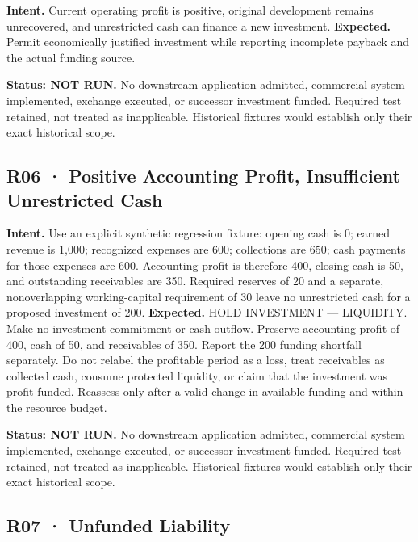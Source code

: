 \documentclass[10pt,letterpaper]{article}
\begin{document}
\textbf{Intent.} Current operating profit is positive, original
development remains unrecovered, and unrestricted cash can finance a new
investment. \textbf{Expected.} Permit economically justified investment
while reporting incomplete payback and the actual funding source.

\textbf{Status: NOT RUN.} No downstream application admitted, commercial
system implemented, exchange executed, or successor investment funded.
Required test retained, not treated as inapplicable. Historical fixtures
would establish only their exact historical scope.

\hypertarget{r06-positive-accounting-profit-insufficient-unrestricted-cash}{%
\subsection{R06 · Positive Accounting Profit, Insufficient Unrestricted
Cash}\label{r06-positive-accounting-profit-insufficient-unrestricted-cash}}

\textbf{Intent.} Use an explicit synthetic regression fixture: opening
cash is 0; earned revenue is 1,000; recognized expenses are 600;
collections are 650; cash payments for those expenses are 600.
Accounting profit is therefore 400, closing cash is 50, and outstanding
receivables are 350. Required reserves of 20 and a separate,
nonoverlapping working-capital requirement of 30 leave no unrestricted
cash for a proposed investment of 200. \textbf{Expected.} HOLD
INVESTMENT --- LIQUIDITY. Make no investment commitment or cash outflow.
Preserve accounting profit of 400, cash of 50, and receivables of 350.
Report the 200 funding shortfall separately. Do not relabel the
profitable period as a loss, treat receivables as collected cash,
consume protected liquidity, or claim that the investment was
profit-funded. Reassess only after a valid change in available funding
and within the resource budget.

\textbf{Status: NOT RUN.} No downstream application admitted, commercial
system implemented, exchange executed, or successor investment funded.
Required test retained, not treated as inapplicable. Historical fixtures
would establish only their exact historical scope.

\hypertarget{r07-unfunded-liability}{%
\subsection{R07 · Unfunded Liability}\label{r07-unfunded-liability}}
\end{document}
